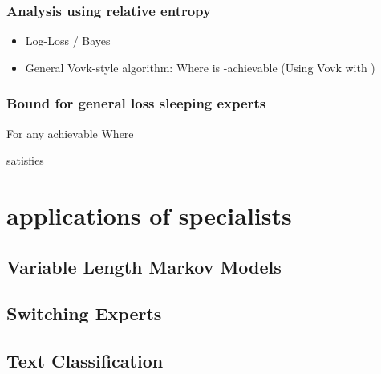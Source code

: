 \documentclass{beamer}
\begin{document}
\begin{frame}
\frametitle{Analysis using relative entropy}
\begin{itemize}
\item Log-Loss / Bayes
\R{\[
  \RE{\vu}{\vp{t}} - \RE{\vu}{\vp{t+1}}
    = \loss(\pred{t},\outcome{t})
       - \sum_{i=1}^N \uu{i} \loss(\advice{i}{t},\outcome{t}).
\]}
\item General Vovk-style algorithm:
Where \R{$\closs{}$} is -achievable (Using Vovk with )
\end{itemize}
\end{frame}

\begin{frame}
\frametitle{Bound for general loss sleeping experts}
For any achievable 
Where 

\B{\SBayes} satisfies
\R{\[
 \sum_{t=1}^T u(\aset{t}) \loss(\pred{t},\outcome{t})
\leq
 \sum_{t=1}^T 
  \sum_{i \in \aset{t}} \uu{i} \loss(\advice{i}{t},\outcome{t})
+
  \RE{\vu}{\vp{1}}~.
\]}
\end{frame}

\section{applications of specialists}

\subsection{Variable Length Markov Models}
\subsection{Switching Experts}
\subsection{Text Classification}
\end{document}
